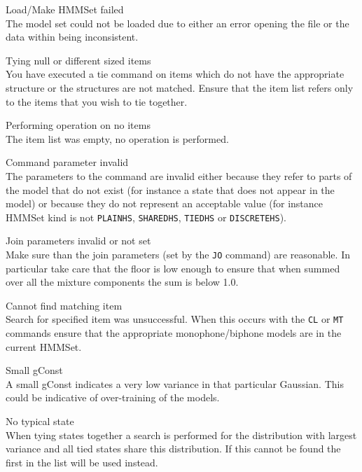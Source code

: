 \begin{itemize}
\begin{itemize}
\end{itemize}


\begin{itemize}

    Load/Make HMMSet failed\\
        The model set could not be loaded due to either an error opening the
        file or the data within being inconsistent.

 Tying null or different sized items\\
        You have executed a tie command on items which do not have the 
        appropriate structure or the structures are not matched.  Ensure 
        that the item list refers only to the items that you wish to tie 
        together.

    Performing operation on no items\\
        The item list was empty, no operation is performed.

    Command parameter invalid\\
        The parameters to the command are invalid either because they
        refer to parts of the model that do not exist (for instance a
        state that does not appear in the model) or because they 
        do not represent an acceptable value (for instance HMMSet kind
        is not \texttt{PLAINHS}, \texttt{SHAREDHS}, \texttt{TIEDHS} or 
        \texttt{DISCRETEHS}).

    Join parameters invalid or not set\\
        Make sure than the join parameters (set by the \texttt{JO} command)
        are reasonable.  In particular take care that the floor is low enough 
        to ensure that when summed over all the mixture
        components the sum is below 1.0.

    Cannot find matching item\\
        Search for specified item was unsuccessful.  When this occurs with
        the \texttt{CL} or \texttt{MT} commands ensure that the appropriate 
        monophone/biphone models are in the current HMMSet.

    Small gConst\\
        A small gConst indicates a very low variance in that particular
        Gaussian.  This could be indicative of over-training of the models.

    No typical state\\
        When tying states together a search is performed for the distribution
        with largest variance and all tied states share this distribution.  If 
        this cannot be found the first in the list will be used instead.


\end{itemize}
\end{itemize}
